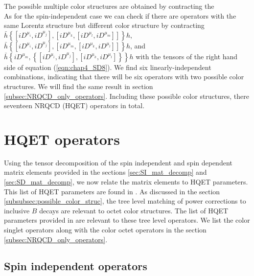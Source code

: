 The possible multiple color structures are obtained by contracting the    \\
As for the spin-independent case we can check if there are operators with the same Lorentz structure but different color structure by contracting  $\bar h\left\{[iD^{\mu_i},iD^{\mu_j}],[iD^{\mu_k},[iD^{\mu_l},iD^{\mu_m}]]\right\}h$, $\bar h\left\{[iD^{\mu_i},iD^{\mu_j}],[iD^{\mu_m},[iD^{\mu_k},iD^{\mu_l}]]\right\}h$, and $\bar h\left\{iD^{\mu_m},\left\{[iD^{\mu_i},iD^{\mu_j}],[iD^{\mu_k},iD^{\mu_l}]\right\}\right\}h$ with the tensors of the right hand side of equation (\ref{eqn:chap4_SD8}). We find six linearly-independent combinations, indicating that there will be six operators with two possible color structures. We will find the same result in section \ref{subsec:NRQCD_only_operators}.  Including these possible color structures, there seventeen NRQCD (HQET) operators in total. 
\section{HQET operators}\label{relating_with_lit}
Using the tensor decomposition of the spin independent and spin dependent matrix elements provided in the sections \ref{sec:SI_mat_decomp} and \ref{sec:SD_mat_decomp}, we now relate the matrix elements to HQET parameters. This list of HQET parameters are found in \cite{Mannel:2010wj}. As discussed in the section \ref{subsubsec:possible_color_struc}, the tree level matching of power corrections to inclusive $B$ decays are relevant to octet color structures. The list of HQET parameters provided in \cite{Mannel:2010wj} are relevant to these tree level operators. We list the color singlet operators along with the color octet operators in the section \ref{subsec:NRQCD_only_operators}. 
\subsection{Spin independent operators}
